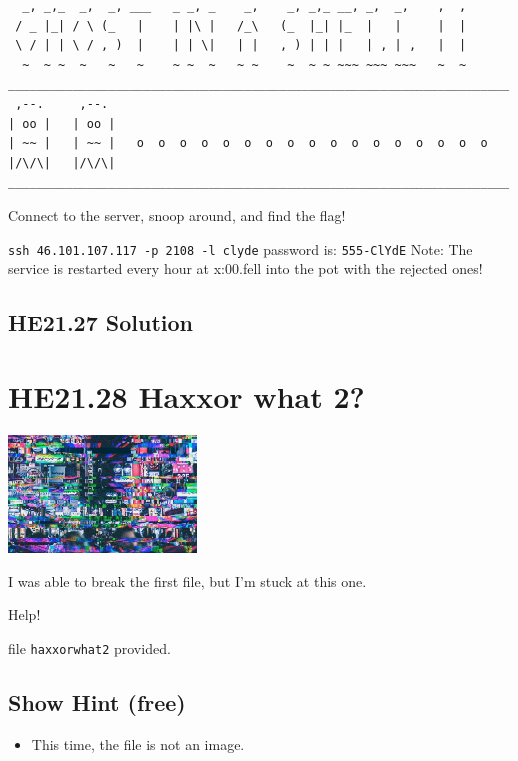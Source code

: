 \documentclass[english,a4paper,nols,noindent]{tufte-handout}
\begin{document}
\begin{verbatim} 
  _, _,_  _,  _, ___   _ _, _    _,    _, _,_ __, _,  _,    ,  ,  
 / _ |_| / \ (_   |    | |\ |   /_\   (_  |_| |_  |   |     |  |  
 \ / | | \ / , )  |    | | \|   | |   , ) | | |   | , | ,   |  |  
  ~  ~ ~  ~   ~   ~    ~ ~  ~   ~ ~    ~  ~ ~ ~~~ ~~~ ~~~   ~  ~  
______________________________________________________________________  
 ,--.     ,--.    
| oo |   | oo |   
| ~~ |   | ~~ |   o  o  o  o  o  o  o  o  o  o  o  o  o  o  o  o  o  
|/\/\|   |/\/\|     
______________________________________________________________________  
\end{verbatim} 

\noindent Connect to the server, snoop around, and find the flag!

\verb+ssh 46.101.107.117 -p 2108 -l clyde+
password is: \verb+555-ClYdE+
Note: The service is restarted every hour at x:00.fell into the pot with the rejected ones!

\hypertarget{he21.27-solution}{%
\subsection{HE21.27 Solution}\label{he21.27-solution}}

\noindent 

\hypertarget{he21.28}{%
  \section{HE21.28 Haxxor what 2?}
  \label{he21.28}}
\begin{marginfigure}
    \includegraphics[width=50mm]{images/challenge28.jpg}
\end{marginfigure}

\noindent I was able to break the first file, but I'm stuck at this one.

Help!

file \verb+haxxorwhat2+ provided.

\subsection{Show Hint (free)}
\begin{itemize}
\item This time, the file is not an image.
\end{itemize}
\end{document}
